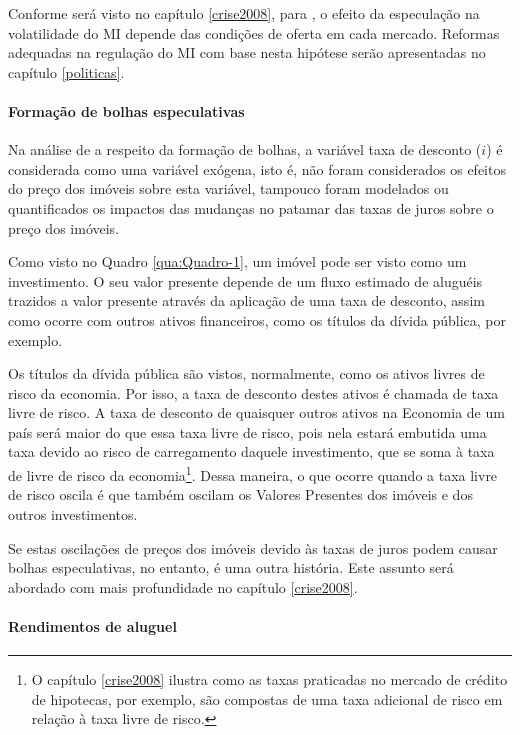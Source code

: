 \documentclass[
	12pt,				%
	oneside,			%
	a4paper,			%
	chapter=TITLE,		%
	section=TITLE,		%
	english,			%
	brazil				%
	]{abntex2}
\begin{document}
\begin{refsection}
Conforme será visto no capítulo \ref{crise2008}, para \textcite[p.
26]{Malpezzi2002TheRO}, o efeito da especulação na volatilidade do \gls{MI} depende das condições
de oferta em cada mercado. Reformas adequadas na regulação do \gls{MI} com base
nesta hipótese serão apresentadas no capítulo \ref{politicas}.

\hypertarget{formauxe7uxe3o-de-bolhas-especulativas}{%
\paragraph{Formação de bolhas especulativas}\label{formauxe7uxe3o-de-bolhas-especulativas}}

Na análise de \textcite{Malpezzi2002TheRO} a respeito da formação de bolhas, a variável
taxa de desconto (\(i\)) é considerada como uma variável exógena, isto é, não
foram considerados os efeitos do preço dos imóveis sobre esta variável, tampouco
foram modelados ou quantificados os impactos das mudanças no patamar das taxas
de juros sobre o preço dos imóveis.

Como visto no Quadro \ref{qua:Quadro-1}, um imóvel pode ser visto como um
investimento. O seu valor presente depende de um fluxo estimado de aluguéis
trazidos a valor presente através da aplicação de uma taxa de desconto, assim
como ocorre com outros ativos financeiros, como os títulos da dívida pública,
por exemplo.

Os títulos da dívida pública são vistos, normalmente, como os ativos livres de
risco da economia. Por isso, a taxa de desconto destes ativos é chamada de taxa
livre de risco. A taxa de desconto de quaisquer outros ativos na Economia de um
país será maior do que essa taxa livre de risco, pois nela estará embutida uma
taxa devido ao risco de carregamento daquele investimento, que se soma à taxa de
livre de risco da economia\footnote{O capítulo \ref{crise2008} ilustra como as taxas praticadas no mercado de
  crédito de hipotecas, por exemplo, são compostas de uma taxa adicional de risco
  em relação à taxa livre de risco.}. Dessa maneira, o que ocorre quando a taxa livre
de risco oscila é que também oscilam os Valores Presentes dos imóveis e dos
outros investimentos.

Se estas oscilações de preços dos imóveis devido às taxas de juros podem causar
bolhas especulativas, no entanto, é uma outra história. Este assunto será
abordado com mais profundidade no capítulo \ref{crise2008}.

\hypertarget{rendimentos-de-aluguel}{%
\paragraph{Rendimentos de aluguel}\label{rendimentos-de-aluguel}}


\end{refsection}
\end{document}

